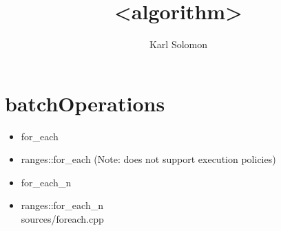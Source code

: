 \documentclass{article}
\begin{document}
\selectfont
\title{<algorithm>}
\author{Karl Solomon}
\maketitle
\tableofcontents
\newpage


\section{batchOperations}
    \begin{itemize}
      \item for\_each
      \item ranges::for\_each (Note: does not support execution policies)
      \item for\_each\_n
      \item ranges::for\_each\_n \\
         {sources/foreach.cpp}
    \end{itemize}
\end{document}
